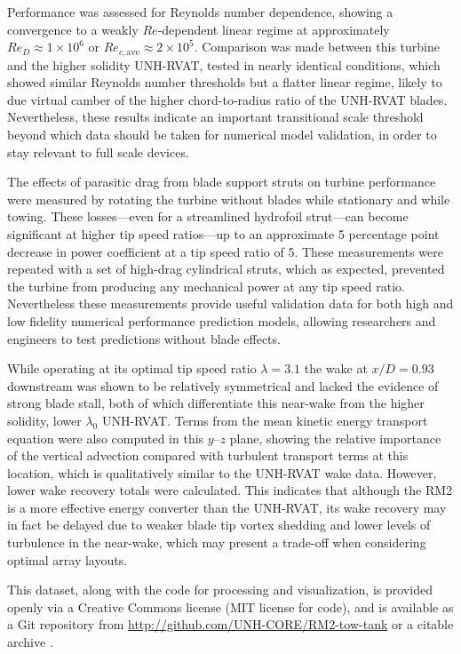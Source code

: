 Performance was assessed for Reynolds number dependence, showing a convergence
to a weakly $Re$-dependent linear regime at approximately $Re_D \approx 1 \times
10^6$ or $Re_{c,\mathrm{ave}} \approx 2 \times 10^5$. Comparison was made
between this turbine and the higher solidity UNH-RVAT, tested in nearly
identical conditions, which showed similar Reynolds number thresholds but a
flatter linear regime, likely to due virtual camber of the higher
chord-to-radius ratio of the UNH-RVAT blades. Nevertheless, these results
indicate an important transitional scale threshold beyond which data should be
taken for numerical model validation, in order to stay relevant to full scale
devices.

The effects of parasitic drag from blade support struts on turbine performance
were measured by rotating the turbine without blades while stationary and while
towing. These losses---even for a streamlined hydrofoil strut---can become
significant at higher tip speed ratios---up to an approximate 5 percentage point
decrease in power coefficient at a tip speed ratio of 5. These measurements were
repeated with a set of high-drag cylindrical struts, which as expected,
prevented the turbine from producing any mechanical power at any tip speed
ratio. Nevertheless these measurements provide useful validation data for both
high and low fidelity numerical performance prediction models, allowing
researchers and engineers to test predictions without blade effects.

While operating at its optimal tip speed ratio $\lambda=3.1$ the wake at
$x/D=0.93$ downstream was shown to be relatively symmetrical and lacked the
evidence of strong blade stall, both of which differentiate this near-wake from
the higher solidity, lower $\lambda_0$ UNH-RVAT. Terms from the mean kinetic
energy transport equation were also computed in this $y$--$z$ plane, showing the
relative importance of the vertical advection compared with turbulent transport
terms at this location, which is qualitatively similar to the UNH-RVAT wake
data. However, lower wake recovery totals were calculated. This indicates that
although the RM2 is a more effective energy converter than the UNH-RVAT, its
wake recovery may in fact be delayed due to weaker blade tip vortex shedding and
lower levels of turbulence in the near-wake, which may present a trade-off when
considering optimal array layouts.

This dataset, along with the code for processing and visualization, is provided
openly via a Creative Commons license (MIT license for code), and is available
as a Git repository from \url{http://github.com/UNH-CORE/RM2-tow-tank} or a
citable archive \cite{Bachant2016-RM2-data}.


